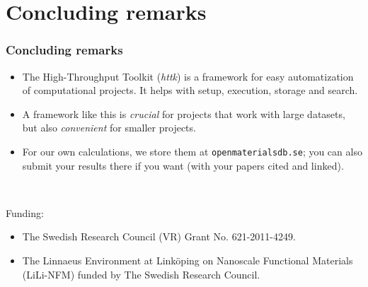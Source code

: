 \documentclass[dvipsnames]{beamer}
\begin{document}




\section{Concluding remarks}
\begin{frame}
\frametitle{Concluding remarks}
\begin{itemize}
\item The High-Throughput Toolkit (\emph{httk}) is a framework for easy automatization of computational projects. It helps with setup, execution, storage and search.
\item A framework like this is \emph{crucial} for projects that work with large datasets, but also \emph{convenient} for smaller projects.
\item For our own calculations, we store them at \texttt{openmaterialsdb.se}; you can also submit your results there if you want (with your papers cited and linked). 
\end{itemize}
\strut\\[0.1cm]
\scriptsize

Funding:
\begin{itemize}
\item The Swedish Research Council (VR) Grant No. 621-2011-4249.
\item The Linnaeus Environment at Link{\"o}ping on Nanoscale Functional Materials (LiLi-NFM) funded by The Swedish Research Council.
\end{itemize}

\end{frame}
\end{document}
